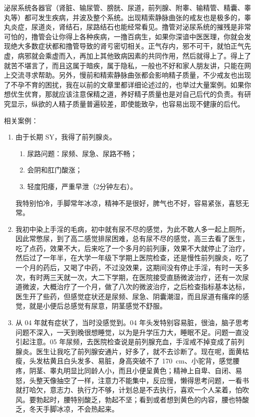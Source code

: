 \documentclass[fontset=founder]{ctexart}
\begin{document}
泌尿系统各器官（肾脏、输尿管、膀胱、尿道，前列腺、附睾、输精管、精囊、睾丸等）都可发生疾病，并波及整个系统。出现精索静脉曲张的戒友也是极多的，睾丸炎症，尿道炎，肾结石，尿路结石也能经常看见。撸管对泌尿系统的摧残是非常可怕的，撸管会让你得上各种疾病，一撸百病生，如果你深谙中医医理，你就会发现绝大多数症状都和撸管导致的肾亏密切相关。正气存内，邪不可干，就怕正气先虚，病邪就会乘虚而入，再加上其他致病因素的共同作用，然后就得上了。得上了就苦不堪言了，而且这属于暗疾，属于隐私，一般也不好和家人朋友讲，只能在网上交流寻求帮助。另外，慢前和精索静脉曲张都会影响精子质量，不少戒友也出现了不孕不育的困扰，我在以前的文章里都详细论述过的，也举过大量案例。如果你想优生优育，那就应该注意保精之道，养好精子质量也是对自己后代的负责。有研究显示，纵欲的人精子质量普遍较差，即使能致孕，也容易出现不健康的后代。

相关案例：

\begin{enumerate}
    \item 由于长期 SY，我得了前列腺炎。\begin{enumerate}
        \item 尿路问题：尿频、尿急、尿路不畅；
        \item 会阴和肛门酸涨；
        \item 轻度阳痿，严重早泄（2分钟左右）。
    \end{enumerate} 我特别怕冷，手脚常年冰凉，精神不是很好，脾气也不好，容易紧张，喜怒无常。
    \item 我初中染上手淫的毛病，初中就有尿不尽的感觉，为此不敢人多一起上厕所，因此常憋尿，到了高二感觉排尿困难，总有尿不尽的感觉，高三去看了医生，吃了点药，效果不大，后来吃了一个多月的前列康，效果不大就停止了治疗，然后过了一年半，在大学一年级下学期上医院检查，还是慢性前列腺炎，吃了一个月的药后，又喝了中药，不过没效果，这期间没有停止手淫，有时一天多次，有时两三天就一次，大二下学期，在医院接受直肠微波治疗，还有一次尿道微波，大概治疗了一个月，做了八次的微波治疗，之后检查指标基本达标，医生开了些药，但感觉症状还是尿频、尿急、阴囊潮湿，而且尿道有瘙痒的感觉，就是小便后总感觉有尿意，阴茎感觉不舒服。
    \item 从 04 年就有症状了，当时没感觉到。04 年头发特别容易脏，很油，脑子思考问题不深入，一天到晚很想睡觉，以为是升学压力大，睡眠不足。问题一直没引起注意。05 年尿频，去医院检查说是前列腺充血，手淫戒不掉变成了前列腺炎。医生让我吃了前列腺安通片，好多了，就不去诊断了。现在呢，面黄枯瘦，头发枯黄且白头发多、易脏，身高突破不了 \SI{170}{\centi\metre}、小驼背，感觉腰疼，阴茎、睾丸明显比同龄人小，而且小便呈黄色；精神上自卑、自闭、易怒，头整天像抽空了一样，注意力不能集中，反应慢，懒得思考问题，一看书就打哈欠，意志力、执行力不够，计划总是不去执行，喜欢一个人呆着，怕吹风。要勃起时，腰特别酸乏，勃起不坚；看到或者想到黄色的内容，腰也特酸乏，冬天手脚冰凉，不会热起来。
\end{enumerate}
\end{document}
